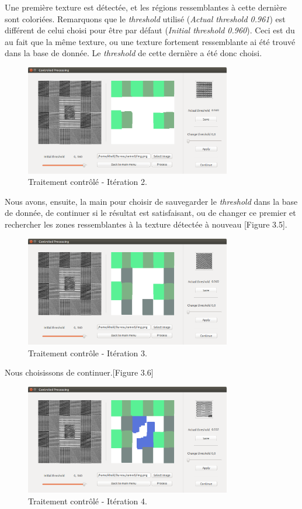 \indent Une première texture est détectée, et les régions ressemblantes à cette dernière sont coloriées. Remarquons que le \textit{threshold} utilisé (\textit{Actual threshold 0.961}) est différent de celui choisi pour être par défaut (\textit{Initial threshold 0.960}). Ceci est du au fait que la même texture, ou une texture fortement ressemblante ai été trouvé dans la base de donnée. Le \textit{threshold} de cette dernière a été donc choisi.

\begin{figure}[H]
	\centering
		\includegraphics[width=9cm,]{Figures/chap3/Capture4543.png}
	\caption[traitementAutofin]{Traitement contrôlé - Itération 2.}
	\label{fig:traitementAutofin}
\end{figure}

\indent Nous avons, ensuite, la main pour choisir de sauvegarder le \textit{threshold} dans la base de donnée, de continuer si le résultat est satisfaisant, ou de changer ce premier et rechercher les zones ressemblantes à la texture détectée à nouveau [Figure 3.5].

\begin{figure}[H]
	\centering
		\includegraphics[width=9cm,]{Figures/chap3/Capture4640.png}
	\caption[traitementAutofin]{Traitement contrôle - Itération 3.}
	\label{fig:traitementAutofin}
\end{figure}

Nous choisissons de continuer.[Figure 3.6]

\begin{figure}[H]
	\centering
		\includegraphics[width=9cm,]{Figures/chap3/Capture4826.png}
	\caption[traitementAutofin]{Traitement contrôlé - Itération 4.}
	\label{fig:traitementAutofin}
\end{figure}

